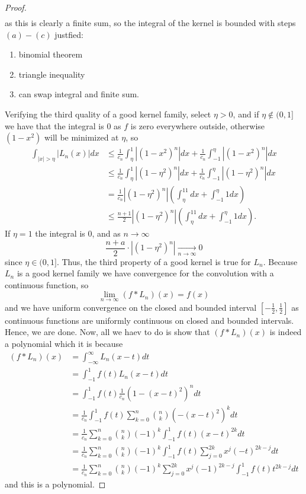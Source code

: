 \documentclass{article}
\begin{document}
\begin{proof}
\begin{align*}
    \end{align*}
    as this is clearly a finite sum, so the integral of the kernel is bounded with steps $(a) -(c)$ justfied:
    \begin{enumerate}[\indent(a)]
        \item binomial theorem 
        \item triangle inequality
        \item can swap integral and finite sum. 
    \end{enumerate}
    Verifying the third quality of a good kernel family, select $\eta > 0$, and if $\eta \notin (0, 1]$ we have that the integral is $0$ as $f$ is zero everywhere outside, otherwise $(1- x^2)$ will be minimized at $\eta$, so 
    \begin{align*}
        \int_{|x| > \eta} |L_n(x)|dx &\leq \frac{1}{c_n} \int_{\eta}^1|(1 - x^2)^n|dx + \frac{1}{c_n}\int_{-1}^{\eta}|(1 - x^2)^n| dx\\
        &\leq \frac{1}{c_n}\int_{\eta}^1|(1 - \eta^2)^n|dx + \frac{1}{c_n}\int_{-1}^{\eta}|(1 - \eta^2)^n|dx \\
        &= \frac{1}{c_n} |(1 - \eta^2)^n|\left(\int_{\eta}^11dx + \int_{-1}^{\eta}1dx \right)\\
        &\leq \frac{n + 1}{2} |(1 - \eta^2)^n|\left(\int_{\eta}^11dx + \int_{-1}^{\eta}1dx \right).
    \end{align*}
    If $\eta = 1$ the integral is $0$, and as $n \to \infty$
    \[
    \frac{n + a}{2}\cdot|(1 - \eta^2)^n| \xrightarrow[n \to \infty]{} 0   
    \]
    since $\eta \in (0, 1]$. Thus, the third property of a good kernel is true for $L_n$. Because $L_n$ is a good kernel family we have convergence for the convolution with a continuous function, so  
    \[    
   \lim\limits_{n \to \infty}(f*L_n)(x) = f(x) 
    \]
    and we have uniform convergence on the closed and bounded interval $\left[-\frac{1}{2}, \frac{1}{2}\right]$ as continuous functions are uniformly continuous on closed and bounded intervals. Hence, we are done. Now, all we haev to do is show that $(f*L_n)(x)$ is indeed a polynomial which it is because
   \begin{align*}
    (f*L_n)(x) &= \int_{-\infty}^{\infty}L_n(x - t)dt \\
    &= \int_{-1}^1f(t)L_n(x - t)dt \\
    &= \int_{-1}^1f(t) \frac{1}{c_n}(1 - (x - t)^2)^n dt \\
    &= \frac{1}{c_n}\int_{-1}^1f(t)\sum\limits_{k = 0}^n{n \choose k }(-(x -t)^2)^k dt \\
    &= \frac{1}{c_n}\sum\limits_{k =0}^n{n \choose k}(-1)^k\int_{-1}^1f(t)(x - t)^{2k}dt \\
    &= \frac{1}{c_n}\sum\limits_{k = 0}^n{n \choose k}(-1)^k\int_{-1}^1f(t) \sum\limits_{j = 0}^{2k}x^j(-t)^{2k -j}dt \\
    &= \frac{1}{c_n}\sum\limits_{k =0}^n{n \choose k}(-1)^k\sum\limits_{j = 0}^{2k}x^j(-1)^{2k -j }\int_{-1}^1f(t)t^{2k -j}dt
   \end{align*} 
   and this is a polynomial. 
\end{proof}
\end{document}
